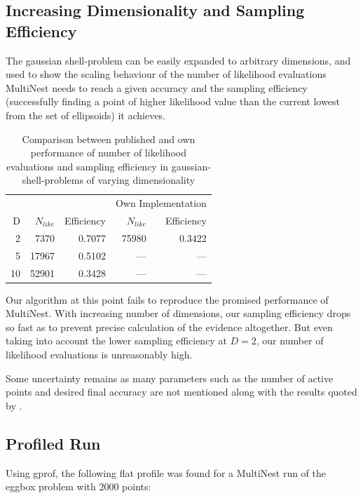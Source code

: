 \documentclass{article}
\begin{document}
\subsection{Increasing Dimensionality and Sampling Efficiency}
The gaussian shell-problem can be easily expanded to arbitrary dimensions, and used to show the scaling behaviour of the number of likelihood evaluations MultiNest needs to reach a given accuracy and the sampling efficiency (successfully finding a point of higher likelihood value than the current lowest from the set of ellipsoids) it achieves.
\begin{table}\label{tab:NlikeEff}
\centering
\begin{tabular}{rrrrr}
\hline
&\multicolumn{2}{c}{\cite{2009MNRAS.398.1601F}} &\multicolumn{2}{c}{Own Implementation} \\
D&$N_{like}$ & Efficiency & $N_{like}$ & Efficiency \\ \hline
 2 &  7370 & 0.7077 & 75980 & 0.3422 \\
 5 & 17967 & 0.5102 &  ---  &  ---   \\
10 & 52901 & 0.3428 &  ---  &  ---   \\ \hline
\end{tabular}
\caption{Comparison between published and own performance of number of likelihood evaluations and sampling efficiency in gaussian-shell-problems of varying dimensionality}
\end{table}

Our algorithm at this point fails to reproduce the promised performance of MultiNest. With increasing number of dimensions, our sampling efficiency drops so fast as to prevent precise calculation of the evidence altogether. But even taking into account the lower sampling efficiency at $D=2$, our number of likelihood evaluations is unreasonably high.

Some uncertainty remains as many parameters such as the number of active points and desired final accuracy are not mentioned along with the results quoted by \cite{2009MNRAS.398.1601F}.

\subsection{Profiled Run}
Using gprof, the following flat profile was found for a MultiNest run of the eggbox problem with 2000 points:
\end{document}
